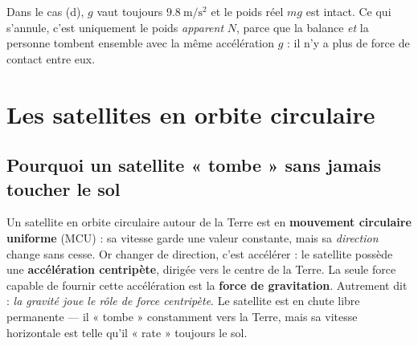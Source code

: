 \documentclass[11pt,a4paper]{article}
\begin{document}
\begin{attention}
Dans le cas (d), $g$ vaut toujours $\SI{9.8}{\metre\per\second\squared}$ et le poids réel
$mg$ est intact. Ce qui s'annule, c'est uniquement le poids \emph{apparent} $N$, parce
que la balance \emph{et} la personne tombent ensemble avec la même accélération $g$ :
il n'y a plus de force de contact entre eux.
\end{attention}

\section{Les satellites en orbite circulaire}

\subsection{Pourquoi un satellite « tombe » sans jamais toucher le sol}

Un satellite en orbite circulaire autour de la Terre est en
\textbf{mouvement circulaire uniforme} (MCU) : sa vitesse garde une valeur constante,
mais sa \emph{direction} change sans cesse. Or changer de direction, c'est accélérer :
le satellite possède une \textbf{accélération centripète}, dirigée vers le centre de la
Terre. La seule force capable de fournir cette accélération est la
\textbf{force de gravitation}. Autrement dit : \emph{la gravité joue le rôle de force
centripète}. Le satellite est en chute libre permanente — il « tombe » constamment vers
la Terre, mais sa vitesse horizontale est telle qu'il « rate » toujours le sol.
\end{document}

